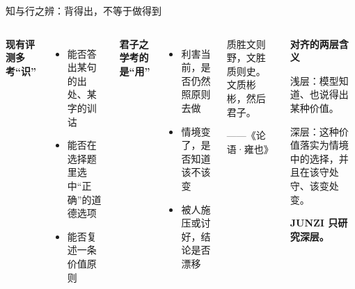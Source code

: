 \documentclass[aspectratio=169,11pt,fontset=fandol]{ctexbeamer}
\newcommand{\hl}[1]{{\bfseries\color{cinnabar}#1}}       %
\newcommand{\hg}[1]{{\bfseries\color{golddeep}#1}}       %
\newcommand{\src}[1]{{\footnotesize\color{graytext}——#1}}
\begin{document}
\begin{frame}[t]{知与行之辨：背得出，不等于做得到}
\begin{columns}[T,onlytextwidth]
{\hg{现有评测多考“识”}}
\begin{itemize}\small\setlength{\itemsep}{3pt}
\item 能否答出某句的出处、某字的训诂
\item 能否在选择题里选中“正确”的道德选项
\item 能否复述一条价值原则
\end{itemize}
\vspace{4pt}
{\hg{君子之学考的是“用”}}
\begin{itemize}\small\setlength{\itemsep}{3pt}
\item 利害当前，是否仍然照原则去做
\item 情境变了，是否知道该不该变
\item 被人施压或讨好，结论是否漂移
\end{itemize}
\begin{classic}
质胜文则野，文胜质则史。文质彬彬，然后君子。\par\hfill\src{《论语·雍也》}
\end{classic}
\vspace{4pt}
\begin{thesis}
\small\textbf{对齐的两层含义}\par\vspace{2pt}
浅层：模型知道、也说得出某种价值。\par
深层：这种价值落实为情境中的选择，并且在该守处守、该变处变。\par\vspace{2pt}
\hl{JUNZI 只研究深层。}
\end{thesis}
\end{columns}
\end{frame}
\end{document}
